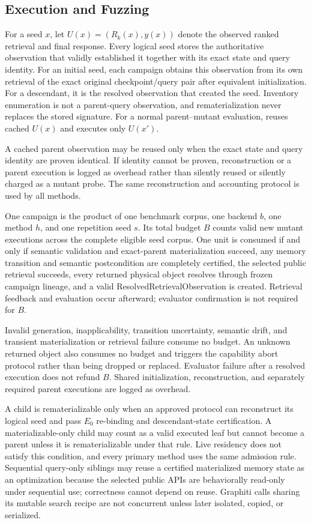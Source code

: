 \subsection{Execution and Fuzzing}
\label{subsec:execution}

For a seed \(x\), let \(U(x)=(R_k(x),y(x))\) denote the observed ranked
retrieval and final response. Every logical seed stores the authoritative
observation that validly established it together with its exact state and query
identity. For an initial seed, each campaign obtains this observation from its
own retrieval of the exact original checkpoint/query pair after equivalent
initialization. For a descendant, it is the resolved observation that created
the seed. Inventory enumeration is not a parent-query observation, and
rematerialization never replaces the stored signature. For a normal
parent--mutant evaluation, \system reuses cached \(U(x)\) and executes only
\(U(x')\).

A cached parent observation may be reused only when the exact state and query
identity are proven identical. If identity cannot be proven, reconstruction
or a parent execution is logged as overhead rather than silently reused or
silently charged as a mutant probe. The same reconstruction and accounting
protocol is used by all methods.

One campaign is the product of one benchmark corpus, one backend \(b\), one
method \(h\), and one repetition seed \(s\). Its total budget \(B\) counts
valid new mutant executions across the complete eligible seed corpus. One unit
is consumed if and only if semantic validation and exact-parent materialization
succeed, any memory transition and semantic postcondition are completely
certified, the selected public retrieval succeeds, every returned physical
object resolves through frozen campaign lineage, and a valid
ResolvedRetrievalObservation is created. Retrieval feedback and evaluation
occur afterward; evaluator confirmation is not required for \(B\).

Invalid generation, inapplicability, transition uncertainty, semantic drift,
and transient materialization or retrieval failure consume no budget. An
unknown returned object also consumes no budget and triggers the capability
abort protocol rather than being dropped or replaced. Evaluator failure after
a resolved execution does not refund \(B\). Shared initialization,
reconstruction, and separately required parent executions are logged as
overhead.

A child is rematerializable only when an approved protocol can reconstruct its
logical seed and pass \(E_0\) re-binding and descendant-state certification. A
materializable-only child may count as a valid executed leaf but cannot
become a parent unless it is rematerializable under that rule.
Live residency does not satisfy this condition, and every primary method uses
the same admission rule. Sequential query-only siblings may reuse a certified
materialized memory state as an optimization because the selected public APIs
are behaviorally read-only under sequential use; correctness cannot depend on
reuse. Graphiti calls sharing its mutable search recipe are not concurrent
unless later isolated, copied, or serialized.

